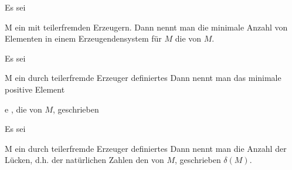 {}
{





Es sei

\mavergleichskette
{\vergleichskette
{ M
}
{ \subseteq }{ \N
}
{  }{
}
{    }{
}
{   }{
}
}
{}{}{}
ein
mit teilerfremden Erzeugern. Dann nennt man die minimale Anzahl von Elementen in einem Erzeugendensystem für $M$ die  von $M$.





}


{}
{





Es sei

\mavergleichskette
{\vergleichskette
{ M
}
{ \subseteq }{ \N
}
{  }{
}
{    }{
}
{   }{
}
}
{}{}{}
ein durch teilerfremde Erzeuger definiertes
Dann nennt man das minimale positive Element

 {}
 {e } {}
 {} {} {} {,}
die  von $M$, geschrieben





}


{}
{





Es sei

\mavergleichskette
{\vergleichskette
{ M
}
{ \subseteq }{ \N
}
{  }{
}
{    }{
}
{   }{
}
}
{}{}{}
ein durch teilerfremde Erzeuger definiertes
Dann nennt man die Anzahl der Lücken, d.h. der natürlichen Zahlen
 den  von $M$, geschrieben $\delta(M)$.





}

